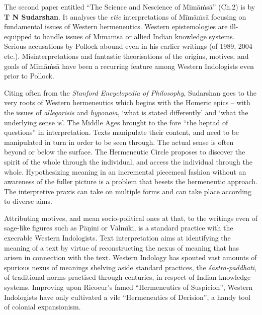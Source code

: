 The second paper entitled “The Science and Nescience of Mīmāṁsā” (Ch.2) is by \textbf{T N Sudarshan}. It analyses the \textit{etic} interpretations of Mīmāṁsā focusing on fundamental issues of Western hermeneutics. Western epistemologies are ill-equipped to handle issues of Mīmāṁsā or allied Indian knowledge systems. Serious accusations by Pollock abound even in his earlier writings (of 1989, 2004 etc.). Misinterpretations and fantastic theorisations of the origins, motives, and goals of Mīmāṁsā have been a recurring feature among Western Indologists even prior to Pollock. 

Citing often from the \textit{Stanford Encyclopedia of Philosophy}, Sudarshan goes to the very roots of Western hermeneutics which begins with the Homeric epics – with the issues of \textit{allegorisis} and \textit{hyponoia}, ‘what is stated differently’ and ‘what the underlying sense is’. The Middle Ages brought to the fore “the heptad of questions” in interpretation. Texts manipulate their content, and need to be manipulated in turn in order to be seen through. The actual sense is often beyond or below the surface. The Hermeneutic Circle proposes to discover the spirit of the whole through the individual, and access the individual through the whole. Hypothesizing meaning in an incremental piecemeal fashion without an awareness of the fuller picture is a problem that besets the hermeneutic approach. The interpretive praxis can take on multiple forms and can take place according to diverse aims.

 Attributing motives, and mean socio-political ones at that, to the writings even of sage-like figures such as Pāṇini or Vālmīki, is a standard practice with the execrable Western Indologists. Text interpretation aims at identifying the meaning of a text by virtue of reconstructing the nexus of meaning that has arisen in connection with the text. Western Indology has spouted vast amounts of spurious nexus of meanings shelving aside standard practices, the \textit{śāstra-paddhati}, of traditional norms practised through centuries, in respect of Indian knowledge systems. Improving upon Ricoeur’s famed “Hermeneutics of Suspicion”, Western Indologists have only cultivated a vile “Hermeneutics of Derision”, a handy tool of colonial expansionism. 

